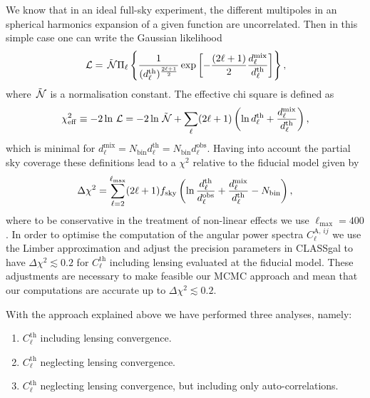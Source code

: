 We know that in an ideal full-sky experiment, the different multipoles in an spherical harmonics expansion of a given function are uncorrelated. Then in this simple case one can write the Gaussian likelihood
\begin{equation}
\label{Eq:GNC-Gaussian-likelihood}
\,{\mathcal L} = \tilde{\,{\mathcal N}} \Pi_\ell \left\lbrace \frac{1}{(d_\ell^{\mathrm{th}})^{\frac{2\ell+1}{2}}} \exp \left[ -\frac{(2\ell+1)}{2} \frac{d_\ell^{\mathrm{mix}}}{d_\ell^{\mathrm{th}}}\right] \right\rbrace,                         
\end{equation}
where $\tilde{\,{\mathcal N}}$ is a normalisation constant. The effective chi square is defined as
\begin{equation}
\label{Eq:GNC-effective-chi2}
\chi^2_{\mathrm{eff}} \equiv -2 \ln \,{\mathcal L} = -2 \ln \tilde{\,{\mathcal N}} + \sum_\ell (2\ell+1)\left( \ln d_\ell^{\mathrm{th}} + \frac{d_\ell^{\mathrm{mix}}}{d_\ell^{\mathrm{th}}} \right), 
\end{equation}
which is minimal for $d_\ell^{\mathrm{mix}}= N_{\mathrm{bin}} d_\ell^{\mathrm{th}} = N_{\mathrm{bin}} d_\ell^{\mathrm{obs}}$. Having into account the partial sky coverage these definitions lead to a $\chi^2$ relative to the fiducial model given by                     
\begin{equation}
\label{Eq:relative-chi2}
\Delta \chi^2 = \sum_{\ell=2}^{\ell_{\mathrm{max}}} (2\ell+1) f_{\mathrm{sky}} \left( \ln \frac{d_\ell^{\mathrm{th}} }{d_\ell^{\mathrm{obs}}} + \frac{d_\ell^{\mathrm{mix}}}{d_\ell^{\mathrm{th}}} - N_{\mathrm{bin}} \right),
\end{equation}                           
where to be conservative in the treatment of non-linear effects we use $\ell_{\mathrm{max}}=400$. In order to optimise the computation of the angular power spectra $C_\ell^{\mathrm{A},\,ij}$ we use the Limber approximation and adjust the precision parameters in CLASSgal to have $\Delta \chi^2 \lesssim 0.2$ for $C_\ell^{\mathrm{th}}$ including lensing evaluated at the fiducial model. These adjustments are necessary to make feasible our MCMC approach and mean that our computations are accurate up to $\Delta \chi^2 \lesssim 0.2$.                              
                     
With the approach explained above we have performed three analyses, namely:
\begin{enumerate}
\item $C_\ell^{\mathrm{th}}$ including lensing convergence.
\item $C_\ell^{\mathrm{th}}$ neglecting lensing convergence.
\item $C_\ell^{\mathrm{th}}$ neglecting lensing convergence, but including only auto-correlations.
\end{enumerate}
                                                  
